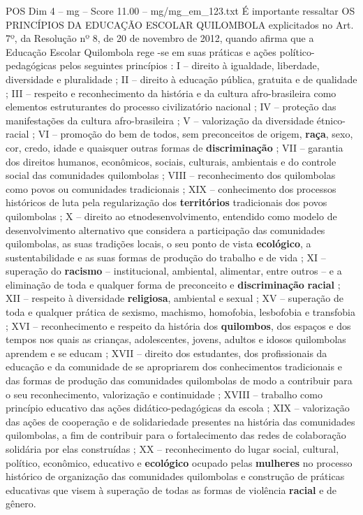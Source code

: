 \begin{textsample}{POS Dim 4 – mg – Score 11.00 – mg/mg\_em\_123.txt}
É importante ressaltar OS PRINCÍPIOS DA EDUCAÇÃO ESCOLAR QUILOMBOLA explicitados no Art. 7º, da Resolução nº 8, de 20 de novembro de 2012, quando afirma que a Educação Escolar Quilombola rege -se em suas práticas e ações político-pedagógicas pelos seguintes princípios : I – direito à igualdade, liberdade, diversidade e pluralidade ; II – direito à educação pública, gratuita e de qualidade ; III – respeito e reconhecimento da história e da cultura afro-brasileira como elementos estruturantes do processo civilizatório nacional ; IV – proteção das manifestações da cultura afro-brasileira ; V – valorização da diversidade étnico-racial ; VI – promoção do bem de todos, sem preconceitos de origem, \textbf{raça}, sexo, cor, credo, idade e quaisquer outras formas de \textbf{discriminação} ; VII – garantia dos direitos humanos, econômicos, sociais, culturais, ambientais e do controle social das comunidades quilombolas ; VIII – reconhecimento dos quilombolas como povos ou comunidades tradicionais ; XIX – conhecimento dos processos históricos de luta pela regularização dos \textbf{territórios} tradicionais dos povos quilombolas ; X – direito ao etnodesenvolvimento, entendido como modelo de desenvolvimento alternativo que considera a participação das comunidades quilombolas, as suas tradições locais, o seu ponto de vista \textbf{ecológico}, a sustentabilidade e as suas formas de produção do trabalho e de vida ; XI – superação do \textbf{racismo} – institucional, ambiental, alimentar, entre outros – e a eliminação de toda e qualquer forma de preconceito e \textbf{discriminação} \textbf{racial} ; XII – respeito à diversidade \textbf{religiosa}, ambiental e sexual ; XV – superação de toda e qualquer prática de sexismo, machismo, homofobia, lesbofobia e transfobia ; XVI – reconhecimento e respeito da história dos \textbf{quilombos}, dos espaços e dos tempos nos quais as crianças, adolescentes, jovens, adultos e idosos quilombolas aprendem e se educam ; XVII – direito dos estudantes, dos profissionais da educação e da comunidade de se apropriarem dos conhecimentos tradicionais e das formas de produção das comunidades quilombolas de modo a contribuir para o seu reconhecimento, valorização e continuidade ; XVIII – trabalho como princípio educativo das ações didático-pedagógicas da escola ; XIX – valorização das ações de cooperação e de solidariedade presentes na história das comunidades quilombolas, a fim de contribuir para o fortalecimento das redes de colaboração solidária por elas construídas ; XX – reconhecimento do lugar social, cultural, político, econômico, educativo e \textbf{ecológico} ocupado pelas \textbf{mulheres} no processo histórico de organização das comunidades quilombolas e construção de práticas educativas que visem à superação de todas as formas de violência \textbf{racial} e de gênero.

\end{textsample}
